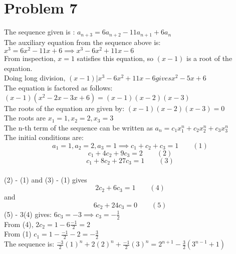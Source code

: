 \documentclass[english]{article}
\begin{document}
\section*{Problem 7}
The sequence given is : $a_{n+3} = 6a_{n+2} - 11 a_{n+1} + 6a_n$\\
The auxiliary equation from the sequence above is: $x^3 = 6x^2 - 11x + 6 \implies x^3 - 6x^2 + 11x - 6 $
\\From inspection, $x = 1$ satisfies this equation, so $(x-1)$ is a root of the equation.\\
Doing long division, $ (x-1) | x^3 - 6x^2 + 11x - 6 gives x^2 - 5x + 6$ \\
The equation is factored as follows: $(x-1)(x^2 - 2x - 3x + 6) = (x-1)(x-2)(x-3)$
\\ The roots of the equation are given by: $ (x-1)(x-2)(x-3) = 0$ \\The roots are $x_1 = 1, x_2 = 2, x_3 = 3$
\\ The n-th term of the sequence can be written as $a_n = c_1 x_1^n + c_2 x_2^n + c_3 x_3^n$\\
The initial conditions are: $$ a_1 = 1, a_2 = 2, a_3 = 1 \implies c_1 + c_2 + c_3 = 1 \qquad (1)$$ $$c_1 + 4c_2 + 9c_3 = 2 \qquad (2)$$  $$c_1 + 8c_2 + 27c_3 = 1\qquad (3)$$ \\ (2) - (1) and (3) - (1) gives $$2c_2 + 6c_3 = 1 \qquad (4)$$ and $$6c_2 + 24c_3 = 0  \qquad (5)$$ (5) - 3(4) gives: $6c_3 = -3 \implies c_3 = -\frac{1}{2}$ \\ From (4), $2c_2 = 1 - 6\frac{-1}{2} = 2$ \\ From (1) $c_1 = 1 - \frac{-1}{2} - 2 = -\frac{3}{2}$
\\ The sequence is: $\frac{-3}{2} (1)^n + 2(2)^n + \frac{-1}{2}(3)^n = 2^{n+1} - \frac{3}{2} (3^{n-1} + 1)$
\end{document}
